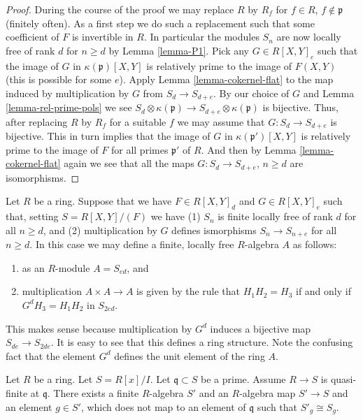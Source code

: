 \begin{proof}
During the course of the proof we may replace $R$ by $R_f$
for $f\in R$, $f\not\in \mathfrak p$ (finitely often).
As a first step we do such a replacement such that
some coefficient of $F$ is invertible in $R$.
In particular the modules $S_n$ are now locally
free of rank $d$ for $n \geq d$ by Lemma \ref{lemma-P1}.
Pick any $G \in R[X, Y]_e$ such that the image of
$G$ in $\kappa(\mathfrak p)[X, Y]$ is relatively
prime to the image of $F(X, Y)$ (this is possible for some $e$).
Apply Lemma \ref{lemma-cokernel-flat} to the map
induced by multiplication by $G$ from $S_{d} \to S_{d + e}$.
By our choice of $G$ and Lemma \ref{lemma-rel-prime-pols}
we see
$S_{d}\otimes \kappa(\mathfrak p) \to S_{d + e} \otimes \kappa(\mathfrak p)$
is bijective. Thus, after replacing $R$ by $R_f$ for a suitable
$f$ we may assume that $G : S_{d} \to S_{d + e}$
is bijective. This in turn implies that the image
of $G$ in $\kappa(\mathfrak p')[X, Y]$ is relatively
prime to the image of $F$ for all primes $\mathfrak p'$
of $R$. And then by Lemma \ref{lemma-cokernel-flat}
again we see that all the maps
$G : S_{d} \to S_{d + e}$, $n \geq d$ are isomorphisms.
\end{proof}

\begin{remark}
\label{remark-algebra}
Let $R$ be a ring. Suppose that we have $F \in R[X, Y]_d$
and $G \in R[X, Y]_e$ such that, setting $S = R[X, Y]/(F)$
we have (1) $S_n$ is finite locally free of rank $d$ for
all $n \geq d$, and (2) multiplication by $G$ defines
ismorphisms $S_n \to S_{n + e}$ for all $n \geq d$. In this
case we may define a finite, locally free $R$-algebra
$A$ as follows:
\begin{enumerate}
\item as an $R$-module $A = S_{ed}$, and
\item multiplication $A \times A \to A$ is given by
the rule that $H_1 H_2 = H_3$ if and only if $G^d H_3 = H_1 H_2$
in $S_{2ed}$.
\end{enumerate}
This makes sense because multiplication by $G^d$
induces a bijective map $S_{de} \to S_{2de}$.
It is easy to see that this defines a ring structure.
Note the confusing fact that the element $G^d$
defines the unit element of the ring $A$.
\end{remark}

\begin{lemma}
\label{lemma-quasi-finite-monogenic}
Let $R$ be a ring. Let $S = R[x]/I$.
Let $\mathfrak q \subset S$ be a prime.
Assume $R \to S$ is quasi-finite at $\mathfrak q$.
There exists a finite $R$-algebra $S'$ and an
$R$-algebra map $S' \to S$ and an element
$g \in S'$, which does not map to an
element of $\mathfrak q$ such that
$S'_g \cong S_g$.
\end{lemma}

